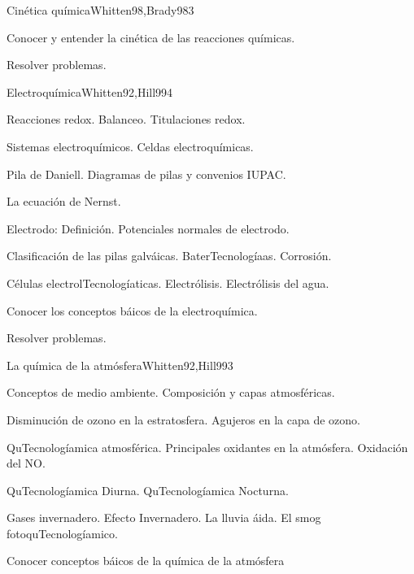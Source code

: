 \begin{syllabus}
\begin{unit}{Cinética química}{Whitten98,Brady98}{3}
   \begin{unitgoals}
      \item Conocer y entender la cinética de las reacciones químicas.
      \item Resolver problemas.
   \end{unitgoals}
\end{unit}

\begin{unit}{Electroquímica}{Whitten92,Hill99}{4}
\begin{topics}
      \item Reacciones redox. Balanceo. Titulaciones redox.
      \item Sistemas electroquímicos. Celdas electroquímicas.
      \item Pila de Daniell. Diagramas de pilas y convenios IUPAC.
      \item La ecuación de Nernst.
      \item Electrodo: Definición. Potenciales normales de electrodo.
      \item Clasificación de las pilas galváicas. BaterTecnologíaas. Corrosión.
      \item Células electrolTecnologíaticas. Electrólisis. Electrólisis del agua.
   \end{topics}

   \begin{unitgoals}
      \item Conocer los conceptos báicos de la electroquímica.
      \item Resolver problemas.
   \end{unitgoals}
\end{unit}

\begin{unit}{La química de la atmósfera}{Whitten92,Hill99}{3}
\begin{topics}
      \item Conceptos de medio ambiente. Composición y capas atmosféricas.
      \item Disminución de ozono en la estratosfera. Agujeros en la capa de ozono.
      \item QuTecnologíamica atmosférica. Principales oxidantes en la atmósfera. Oxidación del NO.
      \item QuTecnologíamica Diurna. QuTecnologíamica Nocturna.
      \item Gases invernadero. Efecto Invernadero. La lluvia áida. El smog fotoquTecnologíamico.
    \end{topics}

   \begin{unitgoals}
      \item Conocer conceptos báicos de la química de la atmósfera
   \end{unitgoals}
\end{unit}

\begin{coursebibliography}
\end{coursebibliography}
\end{syllabus}
